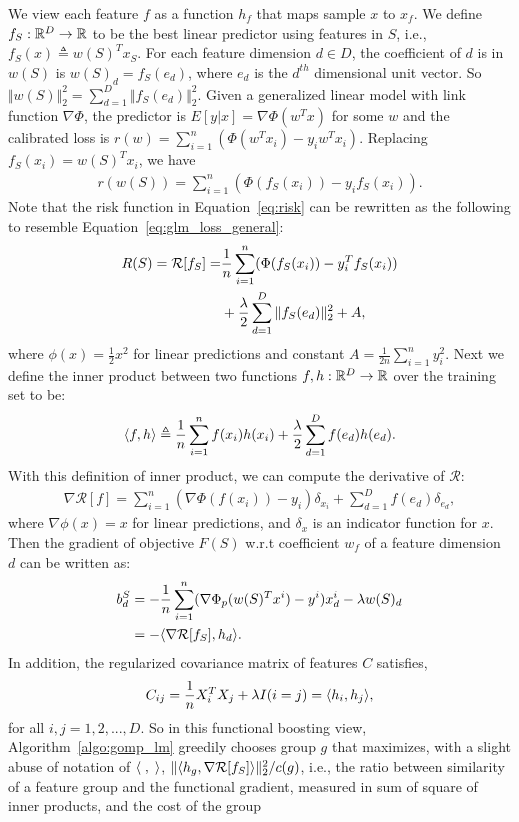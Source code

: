 We view each feature $f$ as a function 
$h_f$ that maps sample $x$ to $x_f$. We define $f_S: \mathbb{R}^{D} \rightarrow \mathbb{R}$ 
to be the best linear predictor using features in $S$, i.e., $f_S(x) \triangleq w(S)^Tx_S$. For each feature dimension $d \in D$, the coefficient of 
$d$ is in $w(S)$ is $w(S)_d = f_S(e_d)$, where $e_d$ is the $d^{th}$ dimensional unit vector. So $\Vert w(S) \Vert_2^2 = \sum _{d = 1}^D \Vert f_S(e_d) \Vert _2^2$. 
Given a generalized linear model with link function $\nabla \Phi$, 
the predictor is $E[ y | x ] = \nabla \Phi(w^Tx)$ for some $w$ and the calibrated loss is $r(w) = \sum _{i=1}^n (\Phi(w^Tx_i) - y_iw^Tx_i)$. 
Replacing $f_S(x_i) = w(S)^Tx_i$, we have 
\begin{align}
	r(w(S)) = \sum _{i=1}^n (\Phi(f_S(x_i)) - y_if_S(x_i)).
	\label{eq:glm_loss_general}
\end{align}
Note that the risk function in Equation~\ref{eq:risk} can be rewritten as 
the following to resemble Equation~\ref{eq:glm_loss_general}:
\begin{align}
 R(S) = 
 	\mathcal{R}[f_S] =& \frac{1}{n} \sum _{i=1}^n (\Phi(f_S(x_i)) - y_i^Tf_S(x_i)) \notag \\
    &{} + \frac{\lambda}{2} \sum _{d = 1}^D \Vert f_S(e_d) \Vert _2^2 + A,
  \label{eq:min_func}
\end{align}
where $\phi(x) = \frac{1}{2}x^2$ for linear predictions and constant 
$A = \frac{1}{2n} \sum _{i=1}^n y_i^2$. 
Next we define the inner product between two functions $f, h : \mathbb{R}^D \rightarrow \mathbb{R}$ 
over the training set to be:
\begin{align}
\langle f, h \rangle \triangleq \frac{1}{n} 
  \sum _{i=1}^n f(x_i)h(x_i) + \frac{\lambda}{2} \sum _{d=1}^D f(e_d)h(e_d).
\end{align}
With this definition of inner product, we can compute the derivative of 
$\mathcal{R}$:
\begin{align}
  \nabla \mathcal{R}[f]  = \sum_{i=1}^n (\nabla\Phi(f(x_i)) 
  	- y_{i})\delta_{x_i} 
    + \sum _{d=1}^D f(e_d)\delta_{e_d},
\end{align}
where $\nabla \phi(x) = x$ for linear predictions, and 
$\delta_x$ is an indicator function for $x$. 
Then the gradient of objective $F(S)$ w.r.t coefficient $w_f$ of a feature dimension  $d$ can be written as:
\begin{align}
 b_{d}^S &= - \frac{1}{n}\sum_{i=1}^n (\nabla\Phi_p(w(S)^Tx^i) - y^{i})x^i_d - \lambda w(S)_d \\
    &= - \langle   \nabla \mathcal{R}[f_S], h_d  \rangle.
\end{align}
In addition, the regularized covariance matrix of features $C$ satisfies,
\begin{equation}
    C_{ij} = \frac{1}{n} X_i^TX_j + \lambda I(i=j) = \langle  h_i, h_j \rangle,
\end{equation}
for all $i, j = 1,2,..., D$.
So in this functional boosting view,  Algorithm~\ref{algo:gomp_lm} greedily chooses group $g$ that maximizes, with a slight abuse of notation of $\langle  \;, \;  \rangle$,
$\Vert \langle  h_g , \nabla \mathcal{R}[f_S]  \rangle \Vert _2^2 / c(g)$, i.e., 
the ratio between similarity of a feature group and the functional gradient, 
measured in sum of square of inner products, and the cost of the group


